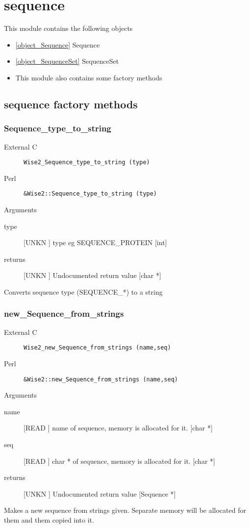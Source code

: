\section{sequence}
\label{module_sequence}
This module contains the following objects

\begin{itemize}
\item \ref{object_Sequence} Sequence

\item \ref{object_SequenceSet} SequenceSet

\item This module also contains some factory methods
\end{itemize}
\subsection{sequence factory methods}
\subsubsection{Sequence_type_to_string}
\begin{description}
\item[External C] {\tt Wise2_Sequence_type_to_string (type)}
\item[Perl] {\tt &Wise2::Sequence_type_to_string (type)}

\end{description}
Arguments
\begin{description}
\item[type] [UNKN ] type eg SEQUENCE_PROTEIN [int]
\item[returns] [UNKN ] Undocumented return value [char *]
\end{description}
Converts sequence type (SEQUENCE_*) to a string


\subsubsection{new_Sequence_from_strings}
\begin{description}
\item[External C] {\tt Wise2_new_Sequence_from_strings (name,seq)}
\item[Perl] {\tt &Wise2::new_Sequence_from_strings (name,seq)}

\end{description}
Arguments
\begin{description}
\item[name] [READ ] name of sequence, memory is allocated for it. [char *]
\item[seq] [READ ] char * of sequence, memory is allocated for it. [char *]
\item[returns] [UNKN ] Undocumented return value [Sequence *]
\end{description}
Makes a new sequence from strings given. 
Separate memory will be allocated for them
and them copied into it.


